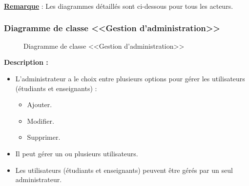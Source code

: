 \documentclass[12pt]{report}
\begin{document}
\textbf{\uline{Remarque}} : Les diagrammes détaillés sont ci-dessous pour tous les acteurs.

\newpage

\subsubsection{Diagramme de classe <<Gestion d'administration>>}

\begin{figure}[h]
\centering
    \centerline{}
    \caption{Diagramme de classe <<Gestion d'administration>>}
\end{figure}

\vspace{0.3in}

\textbf{Description :}

\begin{itemize}
    \item L'administrateur a le choix entre plusieurs options pour gérer les utilisateurs (étudiants et enseignants) :
    \begin{itemize}
        \item Ajouter.
        \item Modifier.
        \item Supprimer.
    \end{itemize}
    \item Il peut gérer un ou plusieurs utilisateurs.
    \item Les utilisateurs (étudiants et enseignants) peuvent être gérés par un seul administrateur.
\end{itemize}
\end{document}
